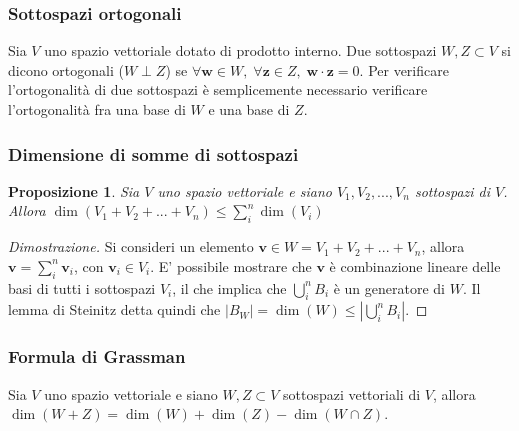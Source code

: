 \documentclass{article}
\newtheorem{proposition}{Proposizione}
\begin{document}
    \vspace{10pt}
    \subsubsection{Sottospazi ortogonali} \label{subsubsec:vsorthogonal}
    Sia $V$ uno spazio vettoriale dotato di prodotto interno. Due sottospazi $W, Z \subset V$ si dicono ortogonali ($W \perp Z$) se $\forall \mathbf{w} \in W, \; \forall \mathbf{z} \in Z, \; \mathbf{w} \cdot \mathbf{z} = 0$.
    Per verificare l'ortogonalità di due sottospazi è semplicemente necessario verificare l'ortogonalità fra una base di $W$ e una base di $Z$.

    \vspace{10pt}
    \subsubsection{Dimensione di somme di sottospazi} \label{subsubsec:vsdimention}
    \begin{proposition}
        Sia $V$ uno spazio vettoriale e siano $V_1, V_2, ..., V_n$ sottospazi di $V$. Allora $\dim(V_1 + V_2 + ... + V_n) \leq \displaystyle \sum_{i}^{n} \dim(V_i)$
    \end{proposition}

    \begin{proof}[Dimostrazione]
        Si consideri un elemento $\mathbf{v} \in W = V_1 + V_2 + ... + V_n$, allora $\mathbf{v} = \displaystyle \sum_{i}^{n} \mathbf{v}_{i}$, con $\mathbf{v}_{i} \in V_i$. 
        E' possibile mostrare che $\mathbf{v}$ è combinazione lineare delle basi di tutti i sottospazi $V_i$, il che implica che $\displaystyle \bigcup_{i}^{n} B_i$ è un generatore di $W$. Il lemma di Steinitz detta quindi che $|B_W| = \dim(W) \leq |\displaystyle \bigcup_{i}^{n} B_i|$.
    \end{proof}

    \vspace{10pt}
    \subsubsection{Formula di Grassman} \label{subsubsec:vsgrassman}
    Sia $V$ uno spazio vettoriale e siano $W, Z \subset V$ sottospazi vettoriali di $V$, allora $\dim(W + Z) = \dim(W) + \dim(Z) - \dim(W \cap Z)$.



\vspace{10pt}
\end{document}
